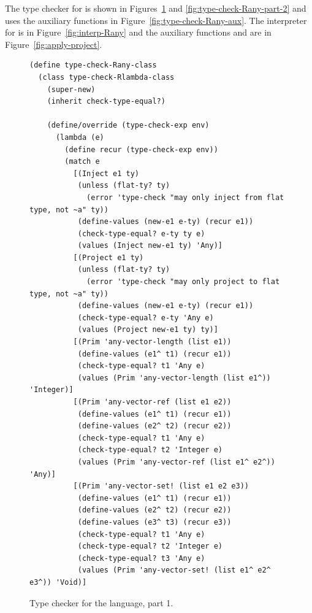 \documentclass[11pt]{book}
\begin{document}
The type checker for \LangAny{} is shown in
Figures~\ref{fig:type-check-Rany-part-1} and
\ref{fig:type-check-Rany-part-2} and uses the auxiliary functions in
Figure~\ref{fig:type-check-Rany-aux}.
%
The interpreter for \LangAny{} is in Figure~\ref{fig:interp-Rany} and the
auxiliary functions  and  are
in Figure~\ref{fig:apply-project}.


\begin{figure}[btp]
 \begin{lstlisting}[basicstyle=\ttfamily\small]
(define type-check-Rany-class
  (class type-check-Rlambda-class
    (super-new)
    (inherit check-type-equal?)

    (define/override (type-check-exp env)
      (lambda (e)
        (define recur (type-check-exp env))
        (match e
          [(Inject e1 ty)
           (unless (flat-ty? ty)
             (error 'type-check "may only inject from flat type, not ~a" ty))
           (define-values (new-e1 e-ty) (recur e1))
           (check-type-equal? e-ty ty e)
           (values (Inject new-e1 ty) 'Any)]
          [(Project e1 ty)
           (unless (flat-ty? ty)
             (error 'type-check "may only project to flat type, not ~a" ty))
           (define-values (new-e1 e-ty) (recur e1))
           (check-type-equal? e-ty 'Any e)
           (values (Project new-e1 ty) ty)]
          [(Prim 'any-vector-length (list e1))
           (define-values (e1^ t1) (recur e1))
           (check-type-equal? t1 'Any e)
           (values (Prim 'any-vector-length (list e1^)) 'Integer)]
          [(Prim 'any-vector-ref (list e1 e2))
           (define-values (e1^ t1) (recur e1))
           (define-values (e2^ t2) (recur e2))
           (check-type-equal? t1 'Any e)
           (check-type-equal? t2 'Integer e)
           (values (Prim 'any-vector-ref (list e1^ e2^)) 'Any)]
          [(Prim 'any-vector-set! (list e1 e2 e3))
           (define-values (e1^ t1) (recur e1))
           (define-values (e2^ t2) (recur e2))
           (define-values (e3^ t3) (recur e3))
           (check-type-equal? t1 'Any e)
           (check-type-equal? t2 'Integer e)
           (check-type-equal? t3 'Any e)
           (values (Prim 'any-vector-set! (list e1^ e2^ e3^)) 'Void)]
\end{lstlisting}
\caption{Type checker for the \LangAny{} language, part 1.}
\label{fig:type-check-Rany-part-1}
\end{figure}
\end{document}
